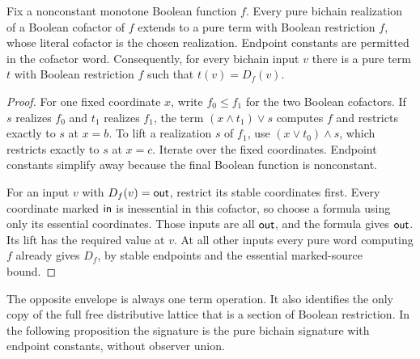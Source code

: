 \begin{proposition}
\label{core:prop:essential-cofactor-lifting}
Fix a nonconstant monotone Boolean function $f$.
Every pure bichain realization of a Boolean cofactor of $f$ extends to
a pure term with Boolean restriction $f$, whose literal cofactor is
the chosen realization. Endpoint constants are permitted in the cofactor
word. Consequently, for every bichain input $v$
there is a pure term $t$ with Boolean restriction $f$ such that
$t(v)=D_f(v)$.
\end{proposition}
\begin{proof}
For one fixed coordinate $x$, write $f_0\leq f_1$ for the two Boolean
cofactors. If $s$ realizes $f_0$ and $t_1$ realizes $f_1$, the term
$(x\wedge t_1)\vee s$ computes $f$ and restricts exactly to $s$
at $x=b$. To lift a realization $s$ of $f_1$, use
$(x\vee t_0)\wedge s$, which restricts exactly to $s$ at $x=c$.
Iterate over the fixed coordinates. Endpoint constants simplify away
because the final Boolean function is nonconstant.

For an input $v$ with $D_f(v)=\mathsf{out}$, restrict its stable
coordinates first. Every coordinate marked $\mathsf{in}$ is inessential
in this cofactor, so choose a formula using only its essential
coordinates. Those inputs are all $\mathsf{out}$, and the formula gives
$\mathsf{out}$. Its lift has the required value at $v$.
At all other inputs every pure word computing $f$ already gives $D_f$,
by stable endpoints and the essential marked-source bound.
\end{proof}

The opposite envelope is always one term operation. It also identifies
the only copy of the full free distributive lattice that is a section
of Boolean restriction. In the following proposition the signature is
the pure bichain signature with endpoint constants, without observer union.

